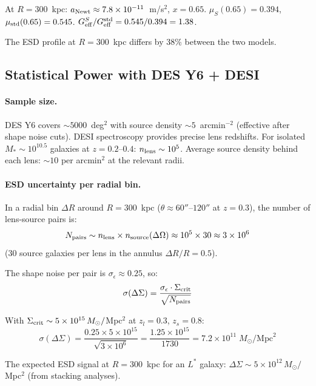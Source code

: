 \documentclass[11pt,a4paper]{article}
\newcommand{\Geff}{G_{\rm eff}}
\newcommand{\ee}[1]{\times 10^{#1}}
\begin{document}
At $R = 300$~kpc:
$a_{\rm Newt} \approx 7.8\ee{-11}$~m/s$^2$, $x = 0.65$.
$\mu_S(0.65) = 0.394$, $\mu_{\rm std}(0.65) = 0.545$.
$\Geff^S/\Geff^{\rm std} = 0.545/0.394 = 1.38$.

The ESD profile at $R = 300$~kpc differs by 38\% between the two models.

\subsection{Statistical Power with DES Y6 + DESI}

\paragraph{Sample size.}
DES Y6 covers $\sim 5000$~deg$^2$ with source density $\sim 5$~arcmin$^{-2}$
(effective after shape noise cuts).  DESI spectroscopy provides precise
lens redshifts.  For isolated $M_* \sim 10^{10.5}$ galaxies at
$z = 0.2$--$0.4$: $n_{\rm lens} \sim 10^5$.  Average source density behind
each lens: $\sim 10$ per arcmin$^2$ at the relevant radii.

\paragraph{ESD uncertainty per radial bin.}
In a radial bin $\Delta R$ around $R = 300$~kpc ($\theta \approx 60''$--$120''$
at $z = 0.3$), the number of lens-source pairs is:
\begin{equation}
N_{\rm pairs} \sim n_{\rm lens} \times n_{\rm source}(\Delta\Omega)
\approx 10^5 \times 30 \approx 3 \times 10^6
\end{equation}
(30 source galaxies per lens in the annulus $\Delta R/R = 0.5$).

The shape noise per pair is $\sigma_\epsilon \approx 0.25$, so:
\begin{equation}
\sigma(\Delta\Sigma) = \frac{\sigma_\epsilon \cdot \Sigma_{\rm crit}}{\sqrt{N_{\rm pairs}}}
\end{equation}

With $\Sigma_{\rm crit} \sim 5 \times 10^{15}\,M_\odot/$Mpc$^2$ at $z_l = 0.3$,
$z_s = 0.8$:
\begin{equation}
\sigma(\Delta\Sigma) = \frac{0.25 \times 5\ee{15}}{\sqrt{3\ee{6}}}
= \frac{1.25\ee{15}}{1730} = 7.2\ee{11}\;M_\odot/\text{Mpc}^2
\end{equation}

The expected ESD signal at $R = 300$~kpc for an $L^*$ galaxy:
$\Delta\Sigma \sim 5\ee{12}\,M_\odot/$Mpc$^2$ (from stacking analyses).
\end{document}
